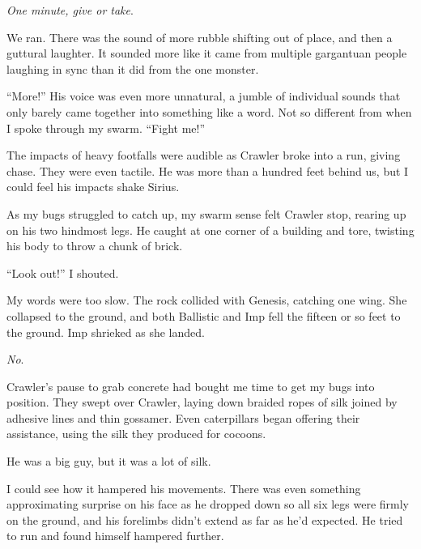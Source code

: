 \emph{One minute, give or take}.



We ran.  There was the sound of more rubble shifting out of place, and then a guttural laughter.  It sounded more like it came from multiple gargantuan people laughing in sync than it did from the one monster.



``More!''  His voice was even more unnatural, a jumble of individual sounds that only barely came together into something like a word.  Not so different from when I spoke through my swarm.  ``Fight me!''



The impacts of heavy footfalls were audible as Crawler broke into a run, giving chase.  They were even tactile.  He was more than a hundred feet behind us, but I could feel his impacts shake Sirius.



As my bugs struggled to catch up, my swarm sense felt Crawler stop, rearing up on his two hindmost legs.  He caught at one corner of a building and tore, twisting his body to throw a chunk of brick.



``Look out!''  I shouted.



My words were too slow.  The rock collided with Genesis, catching one wing.  She collapsed to the ground, and both Ballistic and Imp fell the fifteen or so feet to the ground.  Imp shrieked as she landed.



\emph{No}.



Crawler's pause to grab concrete had bought me time to get my bugs into position.  They swept over Crawler, laying down braided ropes of silk joined by adhesive lines and thin gossamer.  Even caterpillars began offering their assistance, using the silk they produced for cocoons.



He was a big guy, but it was a lot of silk.



I could see how it hampered his movements.  There was even something approximating surprise on his face as he dropped down so all six legs were firmly on the ground, and his forelimbs didn't extend as far as he'd expected.  He tried to run and found himself hampered further.



